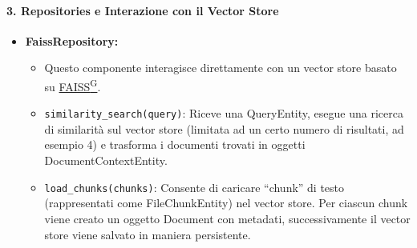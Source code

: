     \paragraph{3. Repositories e Interazione con il Vector Store}
    \begin{itemize}
        \item \textbf{FaissRepository:}
        \begin{itemize}
            \item Questo componente interagisce direttamente con un vector store basato su \href{https://code7crusaders.github.io/docs/PB/documentazione_interna/glossario.html#faiss}{FAISS\textsuperscript{G}}.
            \item \texttt{similarity\_search(query)}: Riceve una QueryEntity, esegue una ricerca di similarità sul vector store (limitata ad un certo numero di risultati, ad esempio 4) e trasforma i documenti trovati in oggetti DocumentContextEntity.
            \item \texttt{load\_chunks(chunks)}: Consente di caricare “chunk” di testo (rappresentati come FileChunkEntity) nel vector store. Per ciascun chunk viene creato un oggetto Document con metadati, successivamente il vector store viene salvato in maniera persistente.
        \end{itemize}
    \end{itemize}


